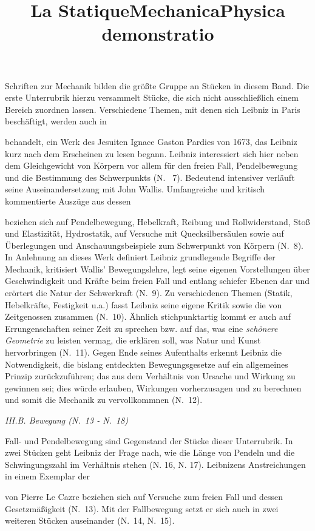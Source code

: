 Schriften zur Mechanik bilden die grö{\ss}te Gruppe an Stücken in diesem Band. Die erste Unterrubrik hierzu versammelt Stücke, die sich nicht ausschlie{\ss}lich einem Bereich zuordnen lassen. 
Verschiedene Themen, mit denen sich Leibniz in Paris beschäftigt, werden auch in \title{La Statique}\cite{00296} behandelt, ein Werk des Jesuiten Ignace Gaston Pardies\protect{} von 1673, das Leibniz kurz nach dem Erscheinen zu lesen begann. Leibniz interessiert sich hier neben dem Gleichgewicht von Körpern vor allem für den freien Fall, Pendelbewegung und die Bestimmung des Schwerpunkts (N. ~7). 
Bedeutend intensiver verläuft seine Auseinandersetzung mit John Wallis\protect{}. Umfangreiche und kritisch kommentierte Auszüge aus dessen \title{Mechanica} beziehen sich auf Pendelbewegung, Hebelkraft, Reibung und Rollwiderstand, Sto{\ss} und Elastizität, Hydrostatik, auf Versuche mit Quecksilbersäulen sowie auf Überlegungen und Anschauungsbeispiele zum Schwerpunkt von Körpern (N.~8).
In Anlehnung an dieses Werk definiert Leibniz grundlegende Begriffe der Mechanik, kritisiert Wallis'\protect{} Bewegungslehre, legt seine eigenen Vorstellungen über Geschwindigkeit und Kräfte beim freien Fall und entlang schiefer Ebenen dar und erörtert die Natur der Schwerkraft (N.~9). Zu verschiedenen Themen (Statik, Hebelkräfte, Festigkeit u.a.) fasst Leibniz seine eigene Kritik sowie die von Zeitgenossen zusammen (N.~10). 
Ähnlich stichpunktartig kommt er auch auf Errungenschaften seiner Zeit zu sprechen bzw. auf das, was eine \textit{schönere Geometrie} zu leisten vermag, die erklären soll, was Natur und Kunst hervorbringen (N.~11). 
Gegen Ende seines Aufenthalts erkennt Leibniz die Notwendigkeit, die bislang entdeckten Bewegungsgesetze auf ein allgemeines Prinzip zurückzuführen; das aus dem Verhältnis von Ursache und Wirkung zu gewinnen sei; dies würde erlauben, Wirkungen vorherzusagen und zu berechnen und somit die Mechanik zu vervollkommnen (N.~12).
\par\vspace{2.0ex}
\noindent
\textit{III.B. Bewegung (N.~13 - N.~18)}
\par\noindent
Fall- und Pendelbewegung sind Gegenstand der Stücke dieser Unterrubrik. In zwei Stücken geht Leibniz der Frage nach, wie die Länge von Pendeln und die Schwingungszahl im Verhältnis stehen (N. 16, N. 17). Leibnizens Anstreichungen in einem Exemplar der \title{Physica demonstratio} von Pierre Le Cazre\protect{} beziehen sich auf Versuche zum freien Fall und dessen Gesetzmä{\ss}igkeit (N.~13). Mit der Fallbewegung setzt er sich auch in zwei weiteren Stücken auseinander (N.~14, N.~15).
